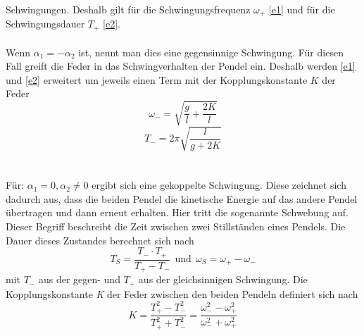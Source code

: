 Schwingungen. Deshalb gilt für die Schwingungsfrequenz $\omega_{+}$ \eqref{e1} und für die Schwingungsdauer $\textit{T}_{+}$
\eqref{e2}.
\\
\\
Wenn $\alpha_{1} = -\alpha_{2}$ ist, nennt man dies eine gegensinnige Schwingung. Für diesen Fall greift die Feder in das Schwingverhalten
der Pendel ein. Deshalb werden \eqref{e1} und \eqref{e2} erweitert um jeweils einen Term mit der Kopplungskonstante $\textit{K}$
der Feder
\begin{equation}
  \omega_{-} = \sqrt{\frac{g}{l} + \frac{2 K}{l}}
  \label{e3}
\end{equation}
\begin{equation}
  \textit{T}_{-} = 2\pi  \sqrt{\frac{l}{g + 2 \textit{K}}}
  \label{e4}
\end{equation}
\\
\\
Für: $\alpha_{1} = 0, \alpha_{2} \neq 0$ ergibt sich eine gekoppelte Schwingung. Diese zeichnet sich dadurch aus, dass die beiden
Pendel die kinetische Energie auf das andere Pendel übertragen und dann erneut erhalten. Hier tritt die sogenannte Schwebung auf.
Dieser Begriff beschreibt die Zeit zwischen zwei Stillständen eines Pendels. Die Dauer dieses Zustandes berechnet sich nach
\begin{equation}
  \textit{T}_{S} = \frac{\textit{T}_{-} \cdot \textit{T}_{+}}{\textit{T}_{+} - \textit{T}_{-}}
  \ \ \text{und} \ \ \omega_{S} = \omega_{+} - \omega_{-}
  \label{e5}
\end{equation}
mit $\textit{T}_{-}$ aus der gegen- und $\textit{T}_{+}$ aus der gleichsinnigen Schwingung. Die Kopplungskonstante \textit{K}
der Feder zwischen den beiden Pendeln definiert sich nach
\begin{equation}
  \textit{K} = \frac{\textit{T}_{+}^{2} - \textit{T}_{-}^{2}}{\textit{T}_{+}^{2} + \textit{T}_{-}^{2}} =
  \frac{\omega_{-}^{2} - \omega_{+}^{2}}{\omega_{-}^{2} + \omega_{+}^{2}}
  \label{e6}
\end{equation}
